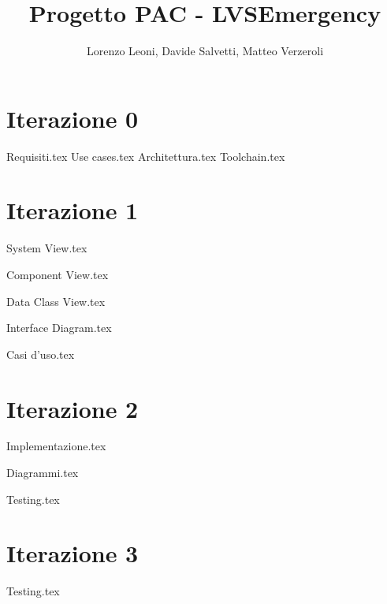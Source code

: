 \documentclass{report}
\title{Progetto PAC - LVSEmergency}
\author{Lorenzo Leoni, Davide Salvetti, Matteo Verzeroli}
\begin{document}
	\maketitle
	\tableofcontents
	
	\chapter{Iterazione 0}

	{Requisiti.tex}
	{Use cases.tex}
	{Architettura.tex}
	\clearpage
	{Toolchain.tex}
	
	\chapter{Iterazione 1}
	{System View.tex}
	
	\clearpage
	
	{Component View.tex}
	
	\clearpage
	
	{Data Class View.tex}	
	
	\clearpage
	
	{Interface Diagram.tex}
	
	\clearpage
	
	{Casi d'uso.tex}
	
	
	
	\chapter{Iterazione 2}
	{Implementazione.tex}
	
	\clearpage
	
	{Diagrammi.tex}
	
	\clearpage
	
	{Testing.tex}
	
	\clearpage
	
	\chapter{Iterazione 3}
	
	\clearpage
	
	{Testing.tex}
	
	\clearpage
		
	
\end{document}

